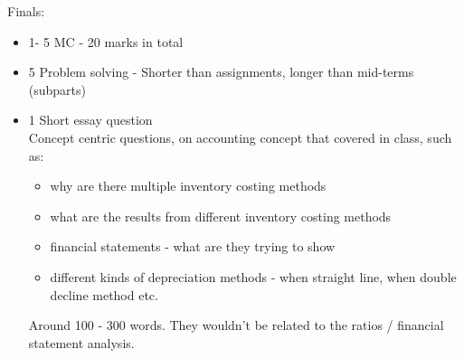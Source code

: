 Finals:
\begin{itemize}
    \item 1- 5 MC - 20 marks in total
    \item 5 Problem solving - Shorter than assignments, longer than mid-terms (subparts)
    \item 1 Short essay question\\
          Concept centric questions, on accounting concept that covered in class, such as:
          \begin{itemize}
              \item why are there multiple inventory costing methods
              \item what are the results from different inventory costing methods
              \item financial statements - what are they trying to show
              \item different kinds of depreciation methods - when straight line, when double decline method etc.
          \end{itemize}
          Around 100 - 300 words. They wouldn't be related to the ratios / financial statement analysis.
\end{itemize}
